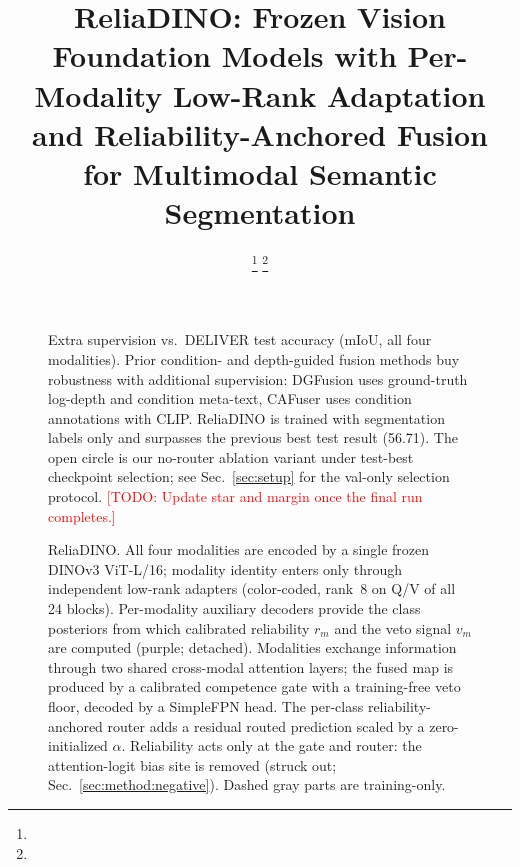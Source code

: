 \documentclass[letterpaper, 10pt, conference]{ieeeconf}
\title{\LARGE \bf
ReliaDINO: Frozen Vision Foundation Models with Per-Modality Low-Rank
Adaptation and Reliability-Anchored Fusion for Multimodal Semantic
Segmentation
}
\author{\todo{Author names}%
\thanks{\todo{Funding / project support footnote.}}%
\thanks{\todo{$^{1}$Authors' affiliation, address, and e-mail (RA-L requires
full author block).}}%
}
\newcommand{\todo}[1]{\textcolor{red}{[TODO: #1]}}
\begin{document}
\maketitle
\thispagestyle{empty}
\pagestyle{empty}



\begin{figure}[t]
  \centering
  \resizebox{0.98\linewidth}{!}{}
  \caption{Extra supervision vs.\ DELIVER test accuracy (mIoU, all four
  modalities). Prior condition- and depth-guided fusion methods buy
  robustness with additional supervision: DGFusion uses ground-truth
  log-depth and condition meta-text, CAFuser uses condition annotations
  with CLIP. ReliaDINO is trained with segmentation labels only and
  surpasses the previous best test result (56.71). The open circle is our
  no-router ablation variant under test-best checkpoint selection; see
  Sec.~\ref{sec:setup} for the val-only selection protocol.
  \todo{Update star and margin once the final run completes.}}
  \label{fig:teaser}
\end{figure}




\begin{figure}[t]
  \centering
  \resizebox{\textwidth}{!}{}
  \caption{ReliaDINO. All four modalities are encoded by a single frozen
  DINOv3 ViT-L/16; modality identity enters only through independent
  low-rank adapters (color-coded, rank~8 on Q/V of all 24 blocks).
  Per-modality auxiliary decoders provide the class posteriors from which
  calibrated reliability $r_m$ and the veto signal $v_m$ are computed
  (purple; detached). Modalities exchange information through two shared
  cross-modal attention layers; the fused map is produced by a calibrated
  competence gate with a training-free veto floor, decoded by a SimpleFPN
  head. The per-class reliability-anchored router adds a residual routed
  prediction scaled by a zero-initialized $\alpha$. Reliability acts only
  at the gate and router: the attention-logit bias site is removed
  (struck out; Sec.~\ref{sec:method:negative}). Dashed gray parts are
  training-only.}
  \label{fig:arch}
\end{figure}
\end{document}
